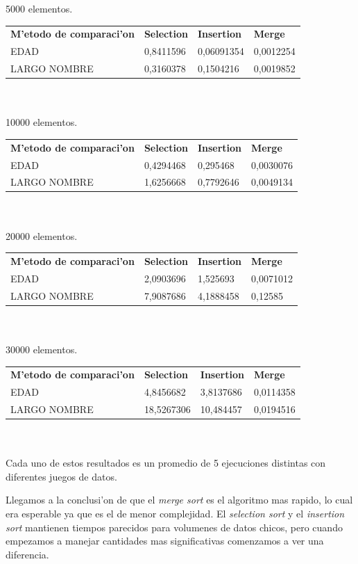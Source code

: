 \documentclass{article}
\begin{document}
	5000 elementos.
	
	\begin{tabular}{llll}
		\textbf{M'etodo de comparaci'on} & \textbf{Selection} & \textbf{Insertion} & \textbf{Merge} \\
		EDAD & 0,8411596 & 0,06091354 & 0,0012254 \\
		LARGO NOMBRE & 0,3160378 & 0,1504216 & 0,0019852 \\
	\end{tabular}\\\\
	
	10000 elementos.
	
	\begin{tabular}{llll}
		\textbf{M'etodo de comparaci'on} & \textbf{Selection} & \textbf{Insertion} & \textbf{Merge} \\
		EDAD & 0,4294468 & 0,295468 & 0,0030076 \\
		LARGO NOMBRE & 1,6256668 & 0,7792646 & 0,0049134 \\
	\end{tabular}\\\\
	
	20000 elementos.
	
	\begin{tabular}{llll}
		\textbf{M'etodo de comparaci'on} & \textbf{Selection} & \textbf{Insertion} & \textbf{Merge} \\
		EDAD & 2,0903696 & 1,525693 & 0,0071012 \\
		LARGO NOMBRE & 7,9087686 & 4,1888458 & 0,12585 \\
	\end{tabular}\\\\
	
	30000 elementos.
	
	\begin{tabular}{llll}
		\textbf{M'etodo de comparaci'on} & \textbf{Selection} & \textbf{Insertion} & \textbf{Merge} \\
		EDAD & 4,8456682 & 3,8137686 & 0,0114358 \\
		LARGO NOMBRE & 18,5267306 & 10,484457 & 0,0194516 \\
	\end{tabular}\\\\
	
	Cada uno de estos resultados es un promedio de 5 ejecuciones distintas con diferentes juegos de datos.
	
	Llegamos a la conclusi'on de que el \emph{merge sort} es el algoritmo mas rapido, lo cual era esperable ya que es el de menor complejidad. El \emph{selection sort} y el \emph{insertion sort} mantienen tiempos parecidos para volumenes de datos chicos, pero cuando empezamos a manejar cantidades mas significativas comenzamos a ver una diferencia. 
\end{document}
